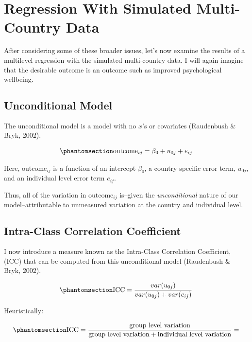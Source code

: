 \documentclass[
  letterpaper,
  DIV=11,
  numbers=noendperiod]{scrreprt}
\begin{document}
\section{Regression With Simulated Multi-Country
Data}\label{sec-regression}

After considering some of these broader issues, let's now examine the
results of a multilevel regression with the simulated multi-country
data. I will again imagine that the desirable outcome is an outcome such
as improved psychological wellbeing.

\subsection{Unconditional Model}\label{sec-unconditional}

The unconditional model is a model with no \(x\)'s or covariates
(Raudenbush \& Bryk, 2002). 

\begin{equation}\phantomsection\label{eq-unconditional}{\text{outcome}_{ij} = \beta_0 + u_{0j} + e_{ij}}\end{equation}

Here, \(\text{outcome}_{ij}\) is a function of an intercept \(\beta_0\),
a country specific error term, \(u_{0j}\), and an individual level error
term \(e_{ij}\).

Thus, all of the variation in \(\text{outcome}_{ij}\) is--given the
\emph{unconditional} nature of our model--attributable to unmeasured
variation at the country and individual level.

\subsection{Intra-Class Correlation Coefficient}\label{sec-ICC}

I now introduce a measure known as the Intra-Class Correlation
Coefficient, (ICC) that can be computed from this unconditional model
(Raudenbush \& Bryk, 2002).  

\begin{equation}\phantomsection\label{eq-ICC}{\text{ICC} = \frac{var(u_{0j})}{var(u_{0j}) + var(e_{ij})}}\end{equation}

Heuristically:

\begin{equation}\phantomsection\label{eq-ICCheuristic}{\text{ICC} = \frac{\text{group level variation}}{\text{group level variation} + \text{individual level variation}} = }\end{equation}
\end{document}
